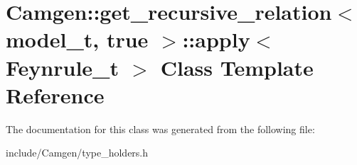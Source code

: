 \hypertarget{a00013}{}\section{Camgen\+:\+:get\+\_\+recursive\+\_\+relation$<$ model\+\_\+t, true $>$\+:\+:apply$<$ Feynrule\+\_\+t $>$ Class Template Reference}
\label{a00013}


The documentation for this class was generated from the following file\+:\begin{DoxyCompactItemize}
\item 
include/\+Camgen/type\+\_\+holders.\+h\end{DoxyCompactItemize}
